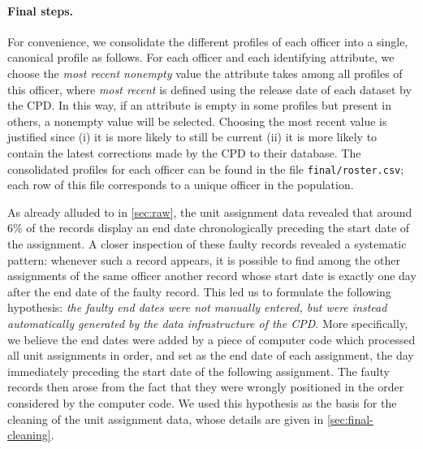 \paragraph{Final steps.} For convenience, we consolidate the
different profiles of each officer into a single, canonical profile as follows.
For each officer and each identifying attribute, we choose the \emph{most recent
nonempty} value the attribute takes among all profiles of this officer, where \emph{most
recent} is defined using the release date of each dataset by the CPD. In this way,
if an attribute is empty in some profiles but present in others, a nonempty value
will be selected. Choosing the most recent value is justified since (i) it is
more likely to still be current (ii) it is more likely to contain the latest
corrections made by the CPD to their database. The consolidated profiles
for each officer can be found in the file \texttt{final/roster.csv};
each row of this file corresponds to a unique officer in the population. 

As already alluded to in \cref{sec:raw}, the unit assignment data revealed that
around 6\% of the records display an end date chronologically preceding the
start date of the assignment. A closer inspection of these faulty records
revealed a systematic pattern: whenever such a record appears, it is possible
to find among the other assignments of the same officer another record whose
start date is exactly one day after the end date of the faulty record. This led
us to formulate the following hypothesis: \emph{the faulty end dates were not
manually entered, but were instead automatically generated by the data
infrastructure of the CPD}.  More specifically, we believe the end dates were
added by a piece of computer code which processed all unit assignments in
order, and set as the end date of each assignment, the day immediately
preceding the start date of the following assignment. The faulty records then
arose from the fact that they were wrongly positioned in the order considered
by the computer code. We used this hypothesis as the basis for the cleaning of the unit assignment data, whose details are given in \cref{sec:final-cleaning}.

